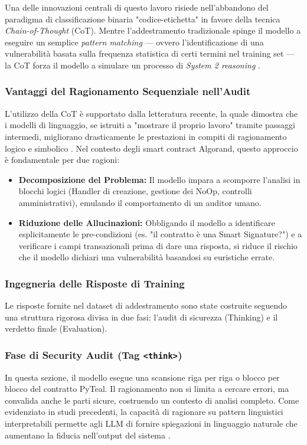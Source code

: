 Una delle innovazioni centrali di questo lavoro risiede nell'abbandono del paradigma di classificazione binaria "codice-etichetta" in favore della tecnica \textit{Chain-of-Thought} (CoT). Mentre l'addestramento tradizionale spinge il modello a eseguire un semplice \textit{pattern matching} — ovvero l'identificazione di una vulnerabilità basata sulla frequenza statistica di certi termini nel training set — la CoT forza il modello a simulare un processo di \textit{System 2 reasoning} \cite{wei2022chain}.

\subsubsection{Vantaggi del Ragionamento Sequenziale nell'Audit}
L'utilizzo della CoT è supportato dalla letteratura recente, la quale dimostra che i modelli di linguaggio, se istruiti a "mostrare il proprio lavoro" tramite passaggi intermedi, migliorano drasticamente le prestazioni in compiti di ragionamento logico e simbolico \cite{wei2022chain}. Nel contesto degli smart contract Algorand, questo approccio è fondamentale per due ragioni:
\begin{itemize}
    \item \textbf{Decomposizione del Problema:} Il modello impara a scomporre l'analisi in blocchi logici (Handler di creazione, gestione dei NoOp, controlli amministrativi), emulando il comportamento di un auditor umano.
    \item \textbf{Riduzione delle Allucinazioni:} Obbligando il modello a identificare esplicitamente le pre-condizioni (es. "il contratto è una Smart Signature?") e a verificare i campi transazionali prima di dare una risposta, si riduce il rischio che il modello dichiari una vulnerabilità basandosi su euristiche errate.
\end{itemize}

\subsubsection{Ingegneria delle Risposte di Training}
Le risposte fornite nel dataset di addestramento sono state costruite seguendo una struttura rigorosa divisa in due fasi: l'audit di sicurezza (Thinking) e il verdetto finale (Evaluation).

\subsubsection{Fase di Security Audit (Tag \texttt{<think>})}
In questa sezione, il modello esegue una scansione riga per riga o blocco per blocco del contratto PyTeal. Il ragionamento non si limita a cercare errori, ma convalida anche le parti sicure, costruendo un contesto di analisi completo. Come evidenziato in studi precedenti, la capacità di ragionare su pattern linguistici interpretabili permette agli LLM di fornire spiegazioni in linguaggio naturale che aumentano la fiducia nell'output del sistema \cite{wei2022chain}.

